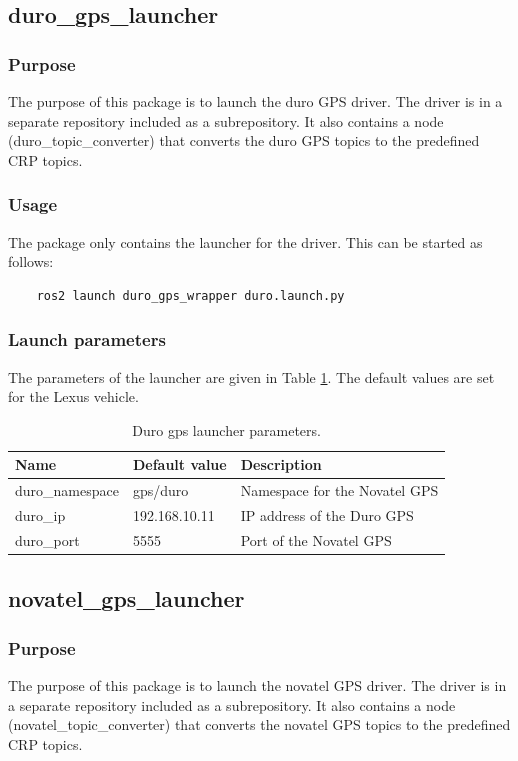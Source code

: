\documentclass[sn-mathphys-num]{sn-jnl}%
\begin{document}
\subsection{duro\_gps\_launcher}
\subsubsection{Purpose}
The purpose of this package is to launch the duro GPS driver. The driver is in a separate repository included as a subrepository. It also contains a node (duro\_topic\_converter) that converts the duro GPS topics to the predefined CRP topics.
\subsubsection{Usage}
The package only contains the launcher for the driver. This can be started as follows:
\begin{lstlisting}
    ros2 launch duro_gps_wrapper duro.launch.py
\end{lstlisting}
\subsubsection{Launch parameters}
The parameters of the launcher are given in Table \ref{tab:duro_gps_wrapper}. The default values are set for the Lexus vehicle.
\begin{table}[!h]
    \captionsetup{justification=centering}
    \normalsize
    \caption{\label{tab:duro_gps_wrapper} Duro gps launcher parameters.}
    \begin{tabular}{| l | l | l |}
        \hline
        \textbf{Name} & \textbf{Default value} & \textbf{Description} \\
        \hline
        duro\_namespace  & gps/duro       & Namespace for the Novatel GPS \\
        \hline
        duro\_ip         & 192.168.10.11  & IP address of the Duro GPS \\
        \hline
        duro\_port       & 5555           & Port of the Novatel GPS \\
        \hline
    \end{tabular}
\end{table}


\subsection{novatel\_gps\_launcher}
\subsubsection{Purpose}
The purpose of this package is to launch the novatel GPS driver. The driver is in a separate repository included as a subrepository. It also contains a node (novatel\_topic\_converter) that converts the novatel GPS topics to the predefined CRP topics.
\end{document}
